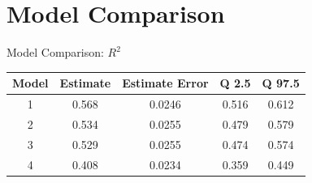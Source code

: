 \documentclass{beamer}
\begin{document}
\section{Model Comparison}

\begin{frame}{Model Comparison: $R^2$ }
    \begin{center}
        
   
    \begin{tabular}{|c|c|c|c|c|}

        \hline
        Model & Estimate & Estimate Error & Q 2.5 & Q 97.5 \\
        \hline
        1 & 0.568   & 0.0246 & 0.516 & 0.612 \\
        2 & 0.534 & 0.0255&  0.479 & 0.579\\
        3 & 0.529 &  0.0255 &  0.474& 0.574 \\
        4 & 0.408 & 0.0234 & 0.359 & 0.449 \\
        \hline


    \end{tabular}  
\end{center}
\end{frame}
\end{document}
